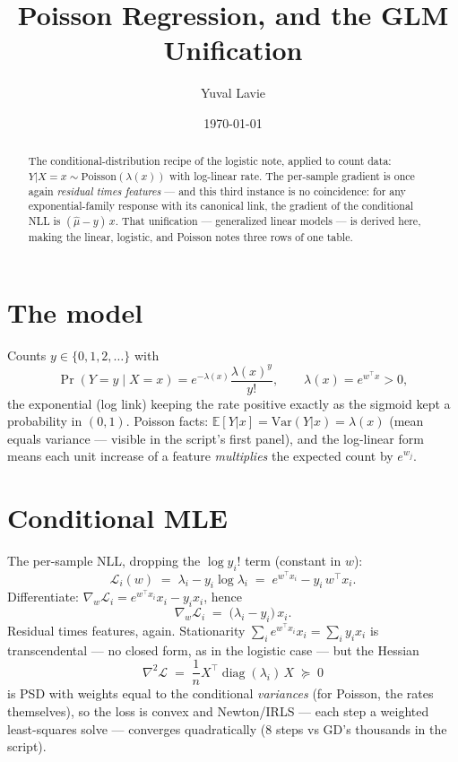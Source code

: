\documentclass[11pt]{article}
\title{Poisson Regression, and the GLM Unification}
\author{Yuval Lavie}
\date{\today}
\begin{document}
\maketitle

\begin{abstract}
The conditional-distribution recipe of the logistic note, applied to
count data: $Y|X{=}x \sim \mathrm{Poisson}(\lambda(x))$ with log-linear
rate. The per-sample gradient is once again \emph{residual times
features} --- and this third instance is no coincidence: for any
exponential-family response with its canonical link, the gradient of the
conditional NLL is $(\hat\mu - y)\,x$. That unification --- generalized
linear models --- is derived here, making the linear, logistic, and
Poisson notes three rows of one table.
\end{abstract}

\section{The model}

Counts $y \in \{0,1,2,\dots\}$ with
\begin{equation}
  \Pr(Y=y \mid X=x)
  = e^{-\lambda(x)} \frac{\lambda(x)^{y}}{y!},
  \qquad
  \lambda(x) = e^{w^\top x} > 0 ,
  \label{eq:model}
\end{equation}
the exponential (log link) keeping the rate positive exactly as the
sigmoid kept a probability in $(0,1)$. Poisson facts:
$\mathbb{E}[Y|x] = \mathrm{Var}(Y|x) = \lambda(x)$ (mean equals
variance --- visible in the script's first panel), and the log-linear
form means each unit increase of a feature \emph{multiplies} the expected
count by $e^{w_j}$.

\section{Conditional MLE}

The per-sample NLL, dropping the $\log y_i!$ term (constant in $w$):
\begin{equation}
  \mathcal{L}_i(w)
  \;=\; \lambda_i - y_i \log\lambda_i
  \;=\; e^{w^\top x_i} - y_i\, w^\top x_i .
  \label{eq:nll}
\end{equation}
Differentiate: $\nabla_w \mathcal{L}_i = e^{w^\top x_i} x_i - y_i x_i$,
hence
\begin{equation}
  \nabla_w \mathcal{L}_i \;=\; \bigl(\lambda_i - y_i\bigr)\, x_i .
  \label{eq:grad}
\end{equation}
Residual times features, again. Stationarity
$\sum_i e^{w^\top x_i} x_i = \sum_i y_i x_i$ is transcendental --- no
closed form, as in the logistic case --- but the Hessian
\begin{equation}
  \nabla^2 \mathcal{L} \;=\; \frac1n X^\top
  \operatorname{diag}(\lambda_i)\, X \;\succeq\; 0
  \label{eq:hessian}
\end{equation}
is PSD with weights equal to the conditional \emph{variances} (for
Poisson, the rates themselves), so the loss is convex and Newton/IRLS
--- each step a weighted least-squares solve --- converges quadratically
(8 steps vs GD's thousands in the script).
\end{document}
